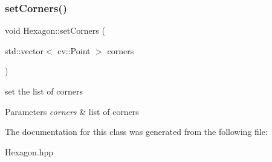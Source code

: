 \subsubsection{\texorpdfstring{set\+Corners()}{setCorners()}}
{\footnotesize\ttfamily void Hexagon\+::set\+Corners (\begin{DoxyParamCaption}\item[{std\+::vector$<$ cv\+::\+Point $>$}]{corners }\end{DoxyParamCaption})}

set the list of corners 
\begin{DoxyParams}{Parameters}
{\em corners} & list of corners \\
\hline
\end{DoxyParams}


The documentation for this class was generated from the following file\+:\begin{DoxyCompactItemize}
\item 
Hexagon.\+hpp\end{DoxyCompactItemize}
